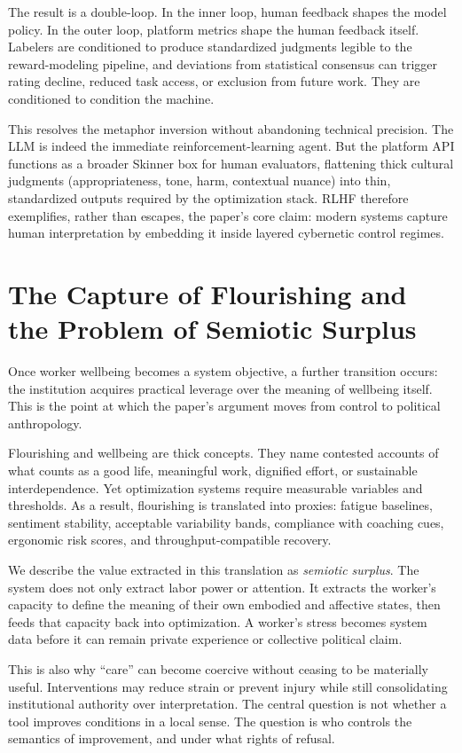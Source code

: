 \documentclass[runningheads]{llncs}
\begin{document}
The result is a double-loop. In the inner loop, human feedback shapes the model policy. In the outer loop, platform metrics shape the human feedback itself. Labelers are conditioned to produce standardized judgments legible to the reward-modeling pipeline, and deviations from statistical consensus can trigger rating decline, reduced task access, or exclusion from future work. They are conditioned to condition the machine.

This resolves the metaphor inversion without abandoning technical precision. The LLM is indeed the immediate reinforcement-learning agent. But the platform API functions as a broader Skinner box for human evaluators, flattening thick cultural judgments (appropriateness, tone, harm, contextual nuance) into thin, standardized outputs required by the optimization stack. RLHF therefore exemplifies, rather than escapes, the paper's core claim: modern systems capture human interpretation by embedding it inside layered cybernetic control regimes.

\section{The Capture of Flourishing and the Problem of Semiotic Surplus}

Once worker wellbeing becomes a system objective, a further transition occurs: the institution acquires practical leverage over the meaning of wellbeing itself. This is the point at which the paper's argument moves from control to political anthropology.

Flourishing and wellbeing are thick concepts. They name contested accounts of what counts as a good life, meaningful work, dignified effort, or sustainable interdependence. Yet optimization systems require measurable variables and thresholds. As a result, flourishing is translated into proxies: fatigue baselines, sentiment stability, acceptable variability bands, compliance with coaching cues, ergonomic risk scores, and throughput-compatible recovery.

We describe the value extracted in this translation as \emph{semiotic surplus}. The system does not only extract labor power or attention. It extracts the worker's capacity to define the meaning of their own embodied and affective states, then feeds that capacity back into optimization. A worker's stress becomes system data before it can remain private experience or collective political claim.

This is also why ``care'' can become coercive without ceasing to be materially useful. Interventions may reduce strain or prevent injury while still consolidating institutional authority over interpretation. The central question is not whether a tool improves conditions in a local sense. The question is who controls the semantics of improvement, and under what rights of refusal.
\end{document}
